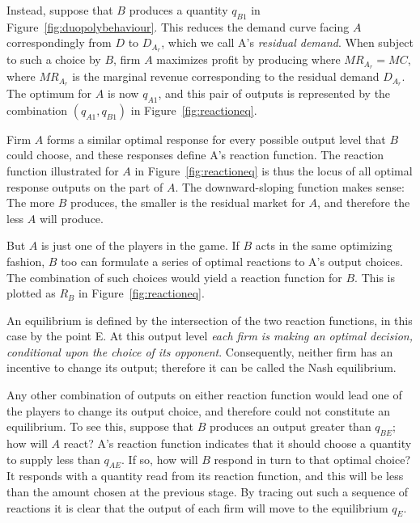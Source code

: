 \newhtmlpage

Instead, suppose that $B$ produces a quantity $q_{B1}$ in Figure~\ref{fig:duopolybehaviour}.
This reduces the demand curve facing $A$
correspondingly from $D$ to $D_{A_{r}}$, which we call A's \textit{%
	residual demand}. When subject to such a choice by $B$, firm $A$ maximizes
profit by producing where $MR_{A_{r}}=MC$, where $MR_{A_{r}}$ is the
marginal revenue corresponding to the residual demand $D_{A_{r}}$. The
optimum for $A$ is now $q_{A1}$, and this pair of outputs is represented by
the combination $(q_{A1},q_{B1})$ in Figure~\ref{fig:reactioneq}.





\newhtmlpage


Firm $A$ forms a similar optimal response for every possible output level
that $B$ could choose, and these responses define A's reaction
function. The reaction function illustrated for $A$ in Figure~\ref{fig:reactioneq}
is thus the locus of all optimal response outputs on the
part of $A$. The downward-sloping function makes sense: The more $B$
produces, the smaller is the residual market for $A$, and therefore the less 
$A$ will produce.

But $A$ is just one of the players in the game. If $B$ acts in the same
optimizing fashion, $B$ too can formulate a series of optimal reactions to 
A's output choices. The combination of such choices would yield a
reaction function for $B$. This is plotted as $R_{B}$ in Figure~\ref{fig:reactioneq}.

An equilibrium is defined by the intersection of the two reaction functions,
in this case by the point E. At this output level \textit{each firm is
	making an optimal decision, conditional upon the choice of its opponent}.
Consequently, neither firm has an incentive to change its output; therefore
it can be called the Nash equilibrium.

Any other combination of outputs on either reaction function would lead one
of the players to change its output choice, and therefore could not
constitute an equilibrium. To see this, suppose that $B$ produces an output
greater than $q_{BE}$; how will $A$ react? A's reaction function
indicates that it should choose a quantity to supply less than $q_{AE}$. If
so, how will $B$ respond in turn to that optimal choice? It responds with a
quantity read from its reaction function, and this will be less than the
amount chosen at the previous stage. By tracing out such a sequence of
reactions it is clear that the output of each firm will move to the
equilibrium $q_{E}$.

